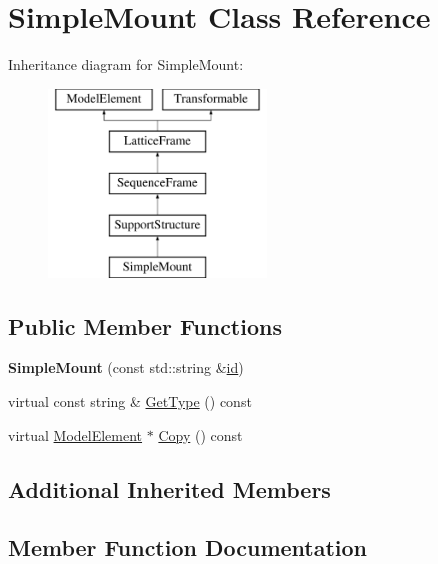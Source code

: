 \hypertarget{classSimpleMount}{}\section{Simple\+Mount Class Reference}
\label{classSimpleMount}
Inheritance diagram for Simple\+Mount\+:\begin{figure}[H]
\begin{center}
\leavevmode
\includegraphics[height=5.000000cm]{classSimpleMount}
\end{center}
\end{figure}
\subsection*{Public Member Functions}
\begin{DoxyCompactItemize}
\item 
\mbox{\label{classSimpleMount_aad6d9c2fb1c287f164695211c475d2cd}} 
{\bfseries Simple\+Mount} (const std\+::string \&\hyperlink{classModelElement_aada171ead2085c75b592cf07d91bc5c2}{id})
\item 
virtual const string \& \hyperlink{classSimpleMount_afc88ec17aa2aea7f526bb7f52913f96a}{Get\+Type} () const
\item 
virtual \hyperlink{classModelElement}{Model\+Element} $\ast$ \hyperlink{classSimpleMount_a73ed116b3cceff1dd3cb71722f117139}{Copy} () const
\end{DoxyCompactItemize}
\subsection*{Additional Inherited Members}


\subsection{Member Function Documentation}
\mbox{\label{classSimpleMount_a73ed116b3cceff1dd3cb71722f117139}} 
